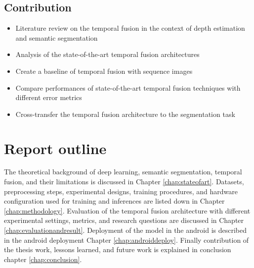     \subsection{Contribution}
    
    \begin{itemize}
    	\item Literature review on the temporal fusion in the context of depth estimation and semantic segmentation
    	\item Analysis of the state-of-the-art temporal fusion architectures
    	\item Create a baseline of temporal fusion with sequence images
    	\item  Compare performances of state-of-the-art temporal fusion techniques with different error metrics
    	\item Cross-transfer the temporal fusion architecture to the segmentation task
  
	\end{itemize}
    \section{Report outline}
    
    The theoretical background of deep learning, semantic segmentation, temporal fusion, and their limitations is discussed in Chapter \ref{chap:stateofart}. Datasets, preprocessing steps, experimental designs, training procedures, and hardware configuration used for training and inferences are listed down in Chapter \ref{chap:methodology}. Evaluation of the temporal fusion architecture with different experimental settings, metrics, and research questions are discussed in Chapter \ref{chap:evaluationandresult}. Deployment of the model in the android is described in the android deployment Chapter \ref{chap:androiddeploy}. Finally contribution of the thesis work, lessons learned, and future work is explained in conclusion chapter \ref{chap:conclusion}. 
    
